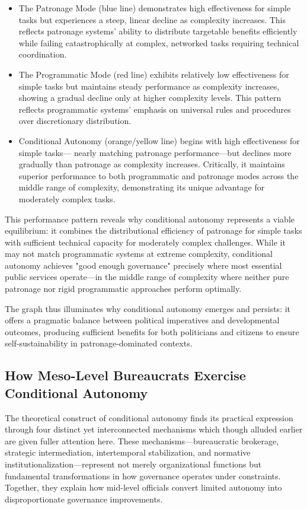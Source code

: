 \begin{itemize}
    \item The Patronage Mode (blue line) demonstrates high effectiveness for simple tasks but experiences a steep, linear decline as complexity increases. This reflects patronage systems' ability to distribute targetable benefits efficiently while failing catastrophically at complex, networked tasks requiring technical coordination.
    \item The Programmatic Mode (red line) exhibits relatively low effectiveness for simple tasks but maintains steady performance as complexity increases, showing a gradual decline only at higher complexity levels. This pattern reflects programmatic systems' emphasis on universal rules and procedures over discretionary distribution.
    \item Conditional Autonomy (orange/yellow line) begins with high effectiveness for simple tasks— nearly matching patronage performance—but declines more gradually than patronage as complexity increases. Critically, it maintains superior performance to both programmatic and patronage modes across the middle range of complexity, demonstrating its unique advantage for moderately complex tasks.
\end{itemize}

This performance pattern reveals why conditional autonomy represents a viable equilibrium: it combines the distributional efficiency of patronage for simple tasks with sufficient technical capacity for moderately complex challenges. While it may not match programmatic systems at extreme complexity, conditional autonomy achieves "good enough governance" precisely where most essential public services operate—in the middle range of complexity where neither pure patronage nor rigid programmatic approaches perform optimally.

The graph thus illuminates why conditional autonomy emerges and persists: it offers a pragmatic balance between political imperatives and developmental outcomes, producing sufficient benefits for both politicians and citizens to ensure self-sustainability in patronage-dominated contexts.

\subsection{How Meso-Level Bureaucrats Exercise Conditional Autonomy}

The theoretical construct of conditional autonomy finds its practical expression through four distinct yet interconnected mechanisms which though alluded earlier are given fuller attention here. These mechanisms—bureaucratic brokerage, strategic intermediation, intertemporal stabilization, and normative institutionalization—represent not merely organizational functions but fundamental transformations in how governance operates under constraints. Together, they explain how mid-level officials convert limited autonomy into disproportionate governance improvements.

